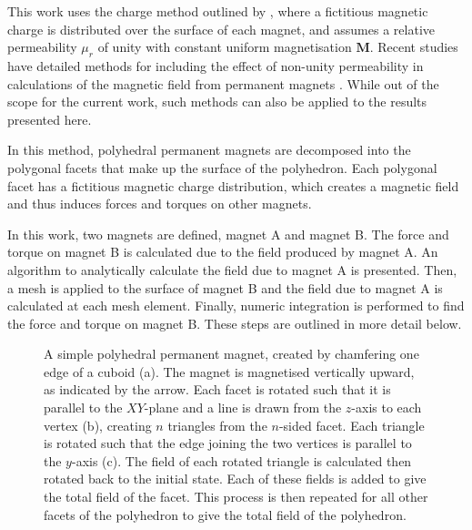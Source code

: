 This work uses the charge method outlined by \textcite{Furlani2001}, where a fictitious magnetic charge is distributed over the surface of each magnet, and assumes a relative permeability \(\mu_r\) of unity with constant uniform magnetisation \(\mathbf{M}\). Recent studies have detailed methods for including the effect of non-unity permeability in calculations of the magnetic field from permanent magnets \cite{Dam2016}. While out of the scope for the current work, such methods can also be applied to the results presented here.

In this method, polyhedral permanent magnets are decomposed into the polygonal facets that make up the surface of the polyhedron. Each polygonal facet has a fictitious magnetic charge distribution, which creates a magnetic field and thus induces forces and torques on other magnets.

In this work, two magnets are defined, magnet A and magnet B. The force and torque on magnet B is calculated due to the field produced by magnet A. An algorithm to analytically calculate the field due to magnet A is presented. Then, a mesh is applied to the surface of magnet B and the field due to magnet A is calculated at each mesh element. Finally, numeric integration is performed to find the force and torque on magnet B. These steps are outlined in more detail below.
\begin{figure}
	\centering
	
	\caption{A simple polyhedral permanent magnet, created by chamfering one edge of a cuboid (a). The magnet is magnetised vertically upward, as indicated by the arrow. Each facet is rotated such that it is parallel to the \(XY\)-plane and a line is drawn from the \(z\)-axis to each vertex (b), creating \(n\) triangles from the \(n\)-sided facet. Each triangle is rotated such that the edge joining the two vertices is parallel to the \(y\)-axis (c). The field of each rotated triangle is calculated then rotated back to the initial state. Each of these fields is added to give the total field of the facet. This process is then repeated for all other facets of the polyhedron to give the total field of the polyhedron.}
	\label{fig:p1decomposethepolygon}
\end{figure}

